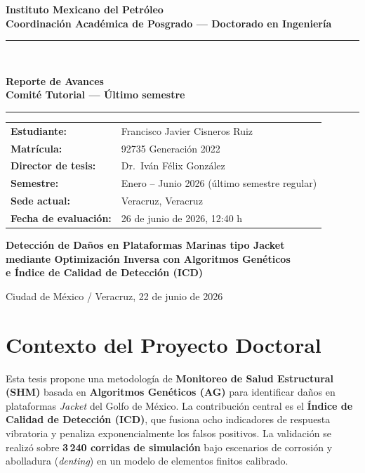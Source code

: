 \documentclass[12pt]{article}
\begin{document}
\begin{titlepage}
  \centering
  \vspace*{1.5cm}
  {\large\bfseries Instituto Mexicano del Petróleo\\[0.3em]
  \normalsize Coordinación Académica de Posgrado — Doctorado en Ingeniería\par}

  \vspace{1.8cm}
  \rule{\textwidth}{1.2pt}\\[0.5em]
  {\Large\bfseries Reporte de Avances\\[0.2em]
  \normalsize Comité Tutorial — Último semestre\par}
  \rule{\textwidth}{1.2pt}

  \vspace{1.5cm}
  \begin{tabular}{ll}
    \textbf{Estudiante:}           & Francisco Javier Cisneros Ruiz \\[0.4em]
    \textbf{Matrícula:}            & 92735 \quad Generación 2022 \\[0.4em]
    \textbf{Director de tesis:}    & Dr.\ Iván Félix González \\[0.4em]
    \textbf{Semestre:}             & Enero -- Junio 2026 (último semestre regular) \\[0.4em]
    \textbf{Sede actual:}          & Veracruz, Veracruz \\[0.4em]
    \textbf{Fecha de evaluación:}  & 26 de junio de 2026, 12:40 h \\
  \end{tabular}

  \vspace{1.8cm}
  {\large\bfseries
  Detección de Daños en Plataformas Marinas tipo Jacket\\
  mediante Optimización Inversa con Algoritmos Genéticos\\
  e Índice de Calidad de Detección (ICD)}

  \vfill
  {\small Ciudad de México / Veracruz, 22 de junio de 2026}
\end{titlepage}

\section{Contexto del Proyecto Doctoral}

Esta tesis propone una metodología de \textbf{Monitoreo de Salud Estructural (SHM)} basada en
\textbf{Algoritmos Genéticos (AG)} para identificar daños en plataformas \textit{Jacket} del Golfo de México.
La contribución central es el \textbf{Índice de Calidad de Detección (ICD)}, que fusiona ocho
indicadores de respuesta vibratoria y penaliza exponencialmente los falsos positivos.
La validación se realizó sobre \textbf{3\,240 corridas de simulación} bajo escenarios de corrosión y
abolladura (\textit{denting}) en un modelo de elementos finitos calibrado.
\end{document}
